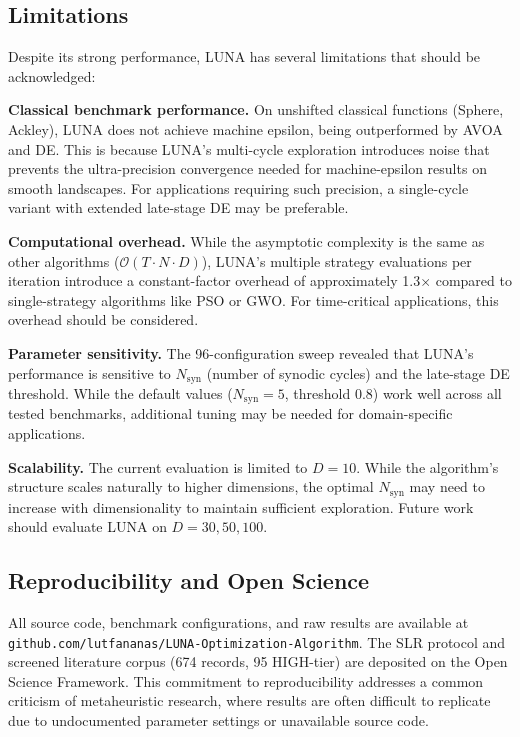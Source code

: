 \documentclass[11pt,a4paper]{article}
\begin{document}
\subsection{Limitations}

Despite its strong performance, LUNA has several limitations that should be acknowledged:

\textbf{Classical benchmark performance.} On unshifted classical functions (Sphere, Ackley), LUNA does not achieve machine epsilon, being outperformed by AVOA and DE. This is because LUNA's multi-cycle exploration introduces noise that prevents the ultra-precision convergence needed for machine-epsilon results on smooth landscapes. For applications requiring such precision, a single-cycle variant with extended late-stage DE may be preferable.

\textbf{Computational overhead.} While the asymptotic complexity is the same as other algorithms ($\mathcal{O}(T \cdot N \cdot D)$), LUNA's multiple strategy evaluations per iteration introduce a constant-factor overhead of approximately 1.3$\times$ compared to single-strategy algorithms like PSO or GWO. For time-critical applications, this overhead should be considered.

\textbf{Parameter sensitivity.} The 96-configuration sweep revealed that LUNA's performance is sensitive to $N_{\text{syn}}$ (number of synodic cycles) and the late-stage DE threshold. While the default values ($N_{\text{syn}}=5$, threshold 0.8) work well across all tested benchmarks, additional tuning may be needed for domain-specific applications.

\textbf{Scalability.} The current evaluation is limited to $D=10$. While the algorithm's structure scales naturally to higher dimensions, the optimal $N_{\text{syn}}$ may need to increase with dimensionality to maintain sufficient exploration. Future work should evaluate LUNA on $D=30, 50, 100$.

\subsection{Reproducibility and Open Science}

All source code, benchmark configurations, and raw results are available at \texttt{github.com/lutfananas/LUNA-Optimization-Algorithm}. The SLR protocol and screened literature corpus (674 records, 95 HIGH-tier) are deposited on the Open Science Framework. This commitment to reproducibility addresses a common criticism of metaheuristic research, where results are often difficult to replicate due to undocumented parameter settings or unavailable source code.
\end{document}
